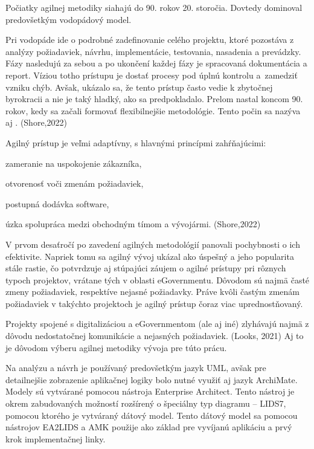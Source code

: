 Počiatky agilnej metodiky siahajú do 90. rokov 20. storočia. Dovtedy dominoval predovšetkým vodopádový model.

Pri vodopáde ide o podrobné zadefinovanie celého projektu, ktoré pozostáva z analýzy požiadaviek, návrhu, implementácie, testovania, nasadenia a prevádzky. Fázy nasledujú za sebou a po ukončení každej fázy je spracovaná dokumentácia a report. Víziou totho prístupu je dostať procesy pod úplnú kontrolu a~zamedziť vzniku chýb. Avšak, ukázalo sa, že tento prístup často vedie k zbytočnej byrokracii a nie je taký hladký, ako sa predpokladalo. Prelom nastal koncom 90. rokov, kedy sa začali formovať flexibilnejšie metodológie. Tento počin sa nazýva aj . \scr(Shore,2022)

\blank
Agilný prístup je veľmi adaptívny, s hlavnými princípmi zahŕňajúcimi:

\startitemize
\item zameranie na uspokojenie zákazníka, 
\item otvorenosť voči zmenám požiadaviek,
\item postupná dodávka software,
\item úzka spolupráca medzi obchodným tímom a vývojármi. \scr(Shore,2022) 
\stopitemize

V prvom desaťročí po zavedení agilných metodológií panovali pochybnosti o ich efektivite. Napriek tomu sa agilný vývoj ukázal ako úspešný a jeho popularita stále rastie, čo potvrdzuje aj stúpajúci záujem o agilné prístupy pri rôznych typoch projektov, vrátane tých v oblasti eGovernmentu. Dôvodom sú najmä časté zmeny požiadaviek, respektíve nejasné požiadavky. Práve kvôli častým zmenám požiadaviek v takýchto projektoch je agilný prístup čoraz viac uprednostňovaný.

Projekty spojené s digitalizáciou a eGovernmentom (ale aj iné) zlyhávajú najmä z dôvodu nedostatočnej komunikácie a nejasných požiadaviek. \scr(Looks, 2021) Aj to je dôvodom výberu agilnej metodiky vývoja pre túto prácu.

Na analýzu a návrh je používaný predovšetkým jazyk UML, avšak pre detailnejšie zobrazenie aplikačnej logiky bolo nutné využiť aj jazyk ArchiMate. Modely sú vytvárané pomocou nástroja Enterprise Architect. Tento nástroj je okrem zabudovaných možností rozšírený o špeciálny typ diagramu -- LIDS7, pomocou ktorého je vytváraný dátový model. Tento dátový model sa pomocou nástrojov EA2LIDS a AMK použije ako základ pre vyvíjanú aplikáciu a prvý krok implementačnej linky. 

